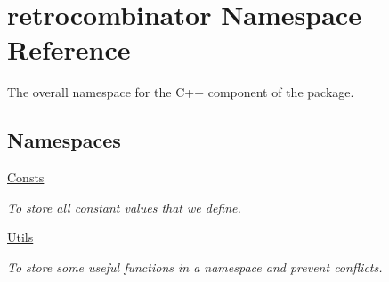 \hypertarget{namespaceretrocombinator}{}\section{retrocombinator Namespace Reference}
\label{namespaceretrocombinator}


The overall namespace for the C++ component of the package.  


\subsection*{Namespaces}
\begin{DoxyCompactItemize}
\item 
 \hyperlink{namespaceretrocombinator_1_1Consts}{Consts}
\begin{DoxyCompactList}\small\item\em To store all constant values that we define. \end{DoxyCompactList}\item 
 \hyperlink{namespaceretrocombinator_1_1Utils}{Utils}
\begin{DoxyCompactList}\small\item\em To store some useful functions in a namespace and prevent conflicts. \end{DoxyCompactList}\end{DoxyCompactItemize}
